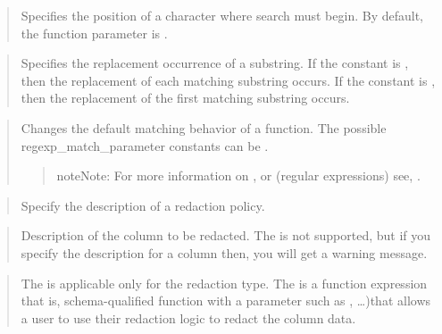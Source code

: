 \documentclass[letterpaper,10pt,english,openany,oneside]{sphinxmanual}
\begin{document}
\begin{quote}

Specifies the position of a character where search must begin. By
default, the function parameter is .
\end{quote}

\begin{quote}

Specifies the replacement occurrence of a substring. If the constant is
, then the replacement of each matching substring occurs. If the
constant is , then the replacement of the first matching
substring occurs.
\end{quote}

\begin{quote}

Changes the default matching behavior of a function. The possible
regexp\_match\_parameter constants can be .
\begin{quote}

\begin{sphinxadmonition}{note}{Note:}
For more information on , or  (regular expressions) see,  .
\end{sphinxadmonition}
\end{quote}
\end{quote}

\begin{quote}

Specify the description of a redaction policy.
\end{quote}

\begin{quote}

Description of the column to be redacted. The  is not
supported, but if you specify the description for a column then, you
will get a warning message.
\end{quote}

\begin{quote}

The  is applicable only for the 
redaction type. The  is a function
expression that is, schema-qualified function with a parameter such as
, …)that allows a user to use
their redaction logic to redact the column data.
\end{quote}
\end{document}
